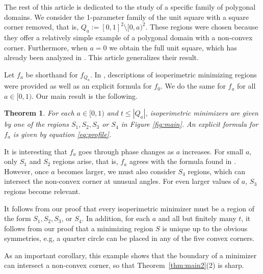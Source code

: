 \documentclass[leqno]{article}
\numberwithin{equation}{section}
\newtheorem{theorem}[equation]{Theorem}
\theoremstyle{definition}
\theoremstyle{remark}
\theoremstyle{plain}
\begin{document}
The rest of this article is dedicated to the study of a specific family of polygonal domains. We consider the 1-parameter family of the unit square with a square corner removed, that is, $Q_a := [0,1]^2 \setminus [0,a)^2$. These regions were chosen because they offer a relatively simple example of a polygonal domain with a non-convex corner. Furthermore, when $a=0$ we obtain the full unit square, which has already been analyzed in \cite{BB}. This article generalizes their result.
 
Let $f_a$ be shorthand for $f_{Q_a}$. In \cite{BB}, descriptions of isoperimetric minimizing regions were provided as well as an explicit formula for $f_0$. We do the same for $f_a$ for all $a \in [0,1)$. Our main result is the following.

\begin{theorem}\label{thm:main}For each $a\in [0,1)$ and $t\leq|Q_a|$, isoperimetric minimizers are given by one of the regions $S_1,S_2,S_3$ or $S_4$ in Figure \ref{fig:main}.  An explicit formula for $f_a$ is given by equation \eqref{eq:profile}.
\end{theorem}

It is interesting that $f_a$ goes through phase changes as $a$ increases. For small $a$, only $S_1$ and $S_2$ regions arise, that is, $f_a$ agrees with the formula found in \cite{BB}. However, once $a$ becomes larger, we must also consider $S_4$ regions, which can intersect the non-convex corner at unusual angles.  For even larger values of $a$, $S_3$ regions become relevant.

It follows from our proof that every isoperimetric minimizer must be a region of the form $S_1,S_2,S_3$, or $S_4$.  In addition, for each $a$ and all but finitely many $t$, it follows from our proof that a minimizing region $S$ is unique up to the obvious symmetries, e.g, a quarter circle can be placed in any of the five convex corners. 

As an important corollary, this example shows that the boundary of a minimizer can intersect a non-convex corner, so that Theorem~\ref{thm:main2}(2) is sharp.
\end{document}
